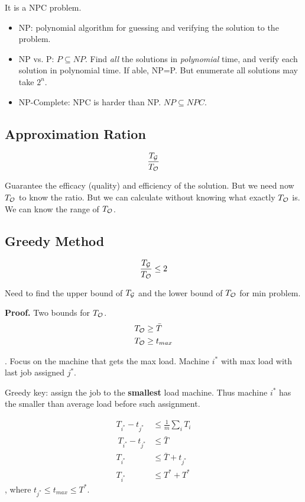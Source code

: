 \documentclass[a4paper]{report}
\theoremstyle{definition}
\begin{document}
It is a NPC problem.

\begin{itemize}
\item NP: polynomial algorithm for guessing and verifying the solution to the problem.
\item NP vs. P: $P\subseteq NP$. Find \textit{all} the solutions in \textit{polynomial} time, and verify each solution in polynomial time. If able, NP=P. But enumerate all solutions may take $2^n$.
\item NP-Complete: NPC is harder than NP. $NP\subseteq NPC$.
\end{itemize}

\subsection{Approximation Ration}
$$
\frac{T_{\mathcal{G}}}{T_{\mathcal{O}}}
$$

Guarantee the efficacy (quality) and efficiency of the solution. But we need now $T_{\mathcal{O}}$ to know the ratio. But we can calculate without knowing what exactly $T_{\mathcal{O}}$ is. We can know the range of $T_{\mathcal{O}}$.

\subsection{Greedy Method}
$$
\frac{T_{\mathcal{G}}}{T_{\mathcal{O}}} \leq 2
$$

Need to find the upper bound of $T_{\mathcal{G}}$ and the lower bound of $T_{\mathcal{O}}$ for min problem.

\textbf{Proof.} Two bounds for $T_{\mathcal{O}}$.
\begin{align}
T_{\mathcal{O}} &\geq \bar T \\
T_{\mathcal{O}} &\geq t_{max}
\end{align}

. Focus on the machine that gets the max load. Machine $i^*$ with max load with last job assigned $j^*$.

Greedy key: assign the job to the \textbf{smallest} load machine. Thus machine $i^*$ has the smaller than average load before such assignment.

\begin{align*}
T_{i^*} - t_{j^*} &\leq \frac{1}{m} \sum_{i} T_i\\\
T_{i^*} - t_{j^*} &\leq \bar T \\
T_{i^*} &\leq \bar T + t_{j^*}\\
T_{i^*} &\leq T^* +T^*
\end{align*}
, where $t_{j^*}\leq t_{max}\leq T^*$.
\end{document}
